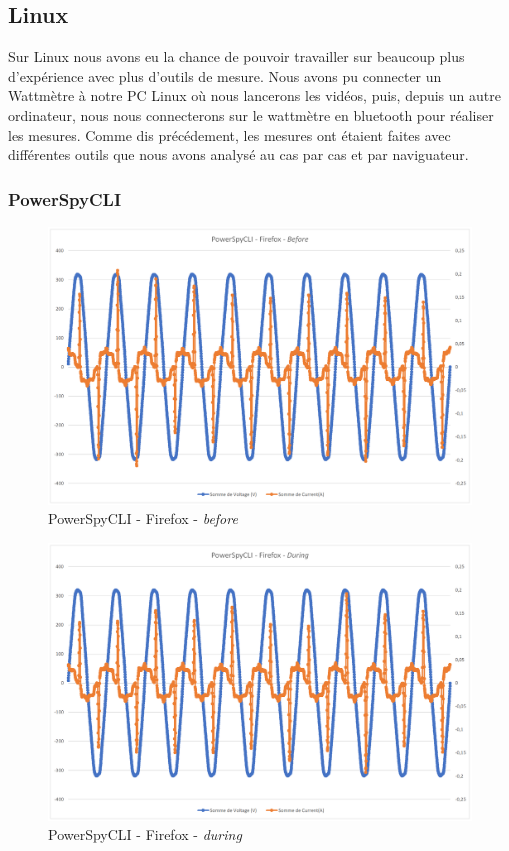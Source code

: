 \documentclass[12pt, a4paper]{report}
\begin{document}
\subsection{Linux}

Sur Linux nous avons eu la chance de pouvoir travailler sur beaucoup plus d'expérience avec plus d'outils de mesure. 
Nous avons pu connecter un Wattmètre à notre PC Linux où nous lancerons les vidéos, puis, depuis un autre ordinateur, nous nous connecterons sur le wattmètre en bluetooth pour réaliser les mesures. Comme dis précédement, les mesures ont étaient faites avec différentes outils que nous avons analysé au cas par cas et par naviguateur.

\subsubsection{PowerSpyCLI}
\label{subsubsec:powerspycli}
\begin{figure}[H]
    \includegraphics[width=1\linewidth]{res//graph/PowerSpyCLI/PowerSpyCLI-FF-Before.png}
    \caption{PowerSpyCLI - Firefox - \textit{before}}
    \label{fig:pscli_ff_before}
\end{figure}
\begin{figure}[H]
    \includegraphics[width=1\linewidth]{res//graph/PowerSpyCLI/PowerSpyCLI-FF-During.png}
    \caption{PowerSpyCLI - Firefox - \textit{during}}
    \label{fig:pscli_ff_during}
\end{figure}
\end{document}
